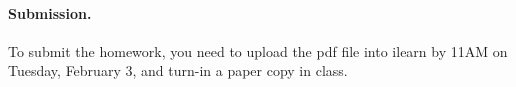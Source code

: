 
\vskip 0.1in
\paragraph{Submission.}
To submit the homework, you need to upload the pdf file into ilearn by 11AM on Tuesday, February 3,
and turn-in a paper copy in class.



\vfill




